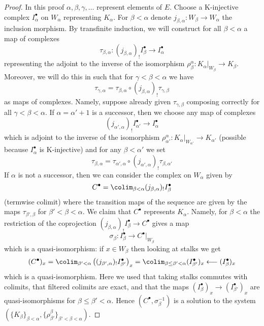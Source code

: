 \begin{proof}
In this proof $\alpha, \beta, \gamma, \ldots$ represent elements of $E$.
Choose a K-injective complex
$I_\alpha^\bullet$ on $W_\alpha$ representing $K_\alpha$.
For $\beta < \alpha$ denote $j_{\beta, \alpha} : W_\beta \to W_\alpha$
the inclusion morphism. By transfinite induction, we will construct for all
$\beta < \alpha$ a map of complexes
$$
\tau_{\beta, \alpha} :
(j_{\beta, \alpha})_!I_\beta^\bullet
\longrightarrow
I_\alpha^\bullet
$$
representing the adjoint to the inverse of the isomorphism
$\rho^\alpha_\beta : K_\alpha|_{W_\beta} \to K_\beta$.
Moreover, we will do this in such that for
$\gamma < \beta < \alpha$ we have
$$
\tau_{\gamma, \alpha} = \tau_{\beta, \alpha} \circ
(j_{\beta, \alpha})_!\tau_{\gamma, \beta}
$$
as maps of complexes. Namely, suppose already given $\tau_{\gamma, \beta}$
composing correctly for all $\gamma < \beta < \alpha$.
If $\alpha = \alpha' + 1$ is a successor, then we choose any map of complexes
$$
(j_{\alpha', \alpha})_!I_{\alpha'}^\bullet \to I_\alpha^\bullet
$$
which is adjoint to the inverse of the isomorphism
$\rho^\alpha_{\alpha'} : K_\alpha|_{W_{\alpha'}} \to K_{\alpha'}$
(possible because $I_\alpha^\bullet$ is K-injective)
and for any $\beta < \alpha'$ we set
$$
\tau_{\beta, \alpha} = \tau_{\alpha', \alpha} \circ
(j_{\alpha', \alpha})_!\tau_{\beta, \alpha'}
$$
If $\alpha$ is not a successor, then
we can consider the complex on $W_\alpha$ given by
$$
C^\bullet = \colim_{\beta < \alpha} (j_{\beta, \alpha})_!I_\beta^\bullet
$$
(termwise colimit) where the transition maps of the sequence
are given by the maps $\tau_{\beta', \beta}$ for
$\beta' < \beta < \alpha$. We claim that $C^\bullet$
represents $K_\alpha$. Namely, for $\beta < \alpha$ the restriction
of the coprojection $(j_{\beta, \alpha})_!I_\beta^\bullet \to C^\bullet$
gives a map
$$
\sigma_\beta : I_\beta^\bullet \longrightarrow C^\bullet|_{W_\beta}
$$
which is a quasi-isomorphism: if $x \in W_\beta$ then looking
at stalks we get
$$
(C^\bullet)_x =
\colim_{\beta' < \alpha}
\left((j_{\beta', \alpha})_!I_{\beta'}^\bullet\right)_x =
\colim_{\beta \leq \beta' < \alpha} (I_{\beta'}^\bullet)_x
\longleftarrow
(I_\beta^\bullet)_x
$$
which is a quasi-isomorphism. Here we used that taking stalks
commutes with colimits, that filtered colimits are exact, and
that the maps $(I_\beta^\bullet)_x \to (I_{\beta'}^\bullet)_x$
are quasi-isomorphisms for $\beta \leq \beta' < \alpha$.
Hence $(C^\bullet, \sigma_\beta^{-1})$ is a solution to the
system $(\{K_\beta\}_{\beta < \alpha},
\{\rho^\beta_{\beta'}\}_{\beta' < \beta < \alpha})$.

\end{proof}
